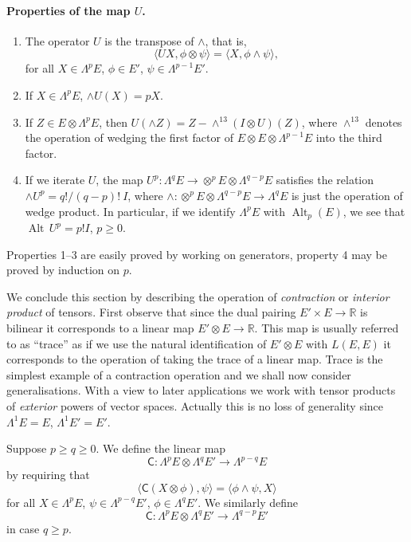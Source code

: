 \paragraph{Properties of the map $U$.}
\begin{enumerate}
\item The operator $U$ is the transpose of $\wedge$, that is,
\[
\langle UX,\phi\otimes\psi\rangle=\langle X,\phi\wedge\psi\rangle,
\]
for all $X\in\Lambda^p E$, $\phi\in E'$, $\psi\in\Lambda^{p-1}E'$.
\item If $X\in\Lambda^p E$, $\wedge U(X)=pX$.
\item If $Z\in E\otimes\Lambda^p E$, then $U(\wedge Z)=Z-\wedge^{13}(I\otimes U)(Z)$, where $\wedge^{13}$ denotes the operation of wedging the first factor of $E\otimes E\otimes\Lambda^{p-1}E$ into the third factor.
\item If we iterate $U$, the map $U^p:\Lambda^q E\to\otimes^p E\otimes\Lambda^{q-p}E$ satisfies the relation $\wedge U^p=q!/(q-p)!\ I$, where $\wedge:\otimes^p E\otimes\Lambda^{q-p}E\to\Lambda^q E$ is just the operation of wedge product. In particular, if we identify $\Lambda^p E$ with $\operatorname{Alt}_p(E)$, we see that $\operatorname{Alt}\,U^p=p!I$, $p\geq0$.
\end{enumerate}
Properties 1--3 are easily proved by working on generators, property 4 may be proved by induction on $p$.

We conclude this section by describing the operation of \emph{contraction} or \emph{interior product} of tensors. First observe that since the dual pairing $E'\times E\to\mathbb R$ is bilinear it corresponds to a linear map $E'\otimes E\to\mathbb R$. This map is usually referred to as ``trace'' as if we use the natural identification of $E'\otimes E$ with $L(E,E)$ it corresponds to the operation of taking the trace of a linear map. Trace is the simplest example of a contraction operation and we shall now consider generalisations. With a view to later applications we work with tensor products of \emph{exterior} powers of vector spaces. Actually this is no loss of generality since $\Lambda^1 E=E$, $\Lambda^1 E'=E'$.

Suppose $p\geq q\geq0$. We define the linear map
\[
\mathsf C:\Lambda^p E\otimes\Lambda^q E'\longrightarrow\Lambda^{p-q}E
\]
by requiring that
\[
\langle\mathsf C(X\otimes\phi),\psi\rangle=\langle\phi\wedge\psi,X\rangle
\]
for all $X\in\Lambda^p E$, $\psi\in\Lambda^{p-q}E'$, $\phi\in\Lambda^q E'$. We similarly define
\[
\mathsf C:\Lambda^p E\otimes\Lambda^q E'\to\Lambda^{q-p}E'
\]
in case $q\geq p$.

